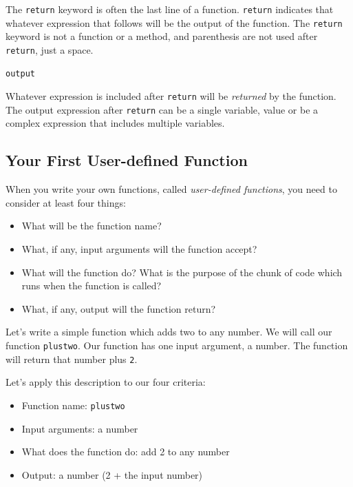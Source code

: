 \documentclass{book}
\providecommand{\tightlist}{%
      \setlength{\itemsep}{0pt}\setlength{\parskip}{0pt}}
\begin{document}
The \lstinline!return! keyword is often the last line of a function.
\lstinline!return! indicates that whatever expression that follows will
be the output of the function. The \lstinline!return! keyword is not a
function or a method, and parenthesis are not used after
\lstinline!return!, just a space.

\begin{lstlisting}
output
\end{lstlisting}

Whatever expression is included after \lstinline!return! will be
\emph{returned} by the function. The output expression after
\lstinline!return! can be a single variable, value or be a complex
expression that includes multiple variables.
    




    
        \subsection{Your First User-defined
Function}\label{your-first-user-defined-function}
    




    
        When you write your own functions, called \emph{user-defined functions},
you need to consider at least four things:

\begin{itemize}
\tightlist
\item
  What will be the function name?
\item
  What, if any, input arguments will the function accept?
\item
  What will the function do? What is the purpose of the chunk of code
  which runs when the function is called?
\item
  What, if any, output will the function return?
\end{itemize}

Let's write a simple function which adds two to any number. We will call
our function \lstinline!plustwo!. Our function has one input argument, a
number. The function will return that number plus \lstinline!2!.

Let's apply this description to our four criteria:

\begin{itemize}
\tightlist
\item
  Function name: \lstinline!plustwo!
\item
  Input arguments: a number
\item
  What does the function do: add 2 to any number
\item
  Output: a number (2 + the input number)
\end{itemize}
\end{document}
